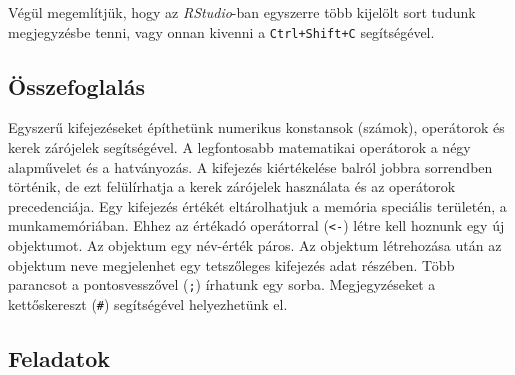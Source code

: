 \documentclass[
]{book}
\makeatletter
\newenvironment{kframe}{%
\medskip{}
\setlength{\fboxsep}{.8em}
 \def\at@end@of@kframe{}%
 \ifinner\ifhmode%
  \def\at@end@of@kframe{\end{minipage}}%
  \begin{minipage}{\columnwidth}%
 \fi\fi%
 \def\FrameCommand##1{\hskip\@totalleftmargin \hskip-\fboxsep
 \colorbox{shadecolor}{##1}\hskip-\fboxsep
     \hskip-\linewidth \hskip-\@totalleftmargin \hskip\columnwidth}%
 \MakeFramed {\advance\hsize-\width
   \@totalleftmargin\z@ \linewidth\hsize
   \@setminipage}}%
 {\par\unskip\endMakeFramed%
 \at@end@of@kframe}
\newenvironment{rmdblock}[1]
  {
  \begin{itemize}
  \renewcommand{\labelitemi}{
    \raisebox{-.7\height}[0pt][0pt]{
      {\setkeys{Gin}{width=3em,keepaspectratio}\texttt{[image: images/\#1]}}
    }
  }
  \setlength{\fboxsep}{1em}
  \begin{kframe}
  \item
  }
  {
  \end{kframe}
  \end{itemize}
  }
\newenvironment{rmdsummary}
  {\begin{rmdblock}{summary}}
  {\end{rmdblock}}
\makeatother
\begin{document}
Végül megemlítjük, hogy az \emph{RStudio}-ban egyszerre több kijelölt sort tudunk megjegyzésbe tenni, vagy onnan kivenni a \texttt{Ctrl+Shift+C} segítségével.

\hypertarget{az-r-nyelv-1-summary}{%
\subsection{Összefoglalás}\label{az-r-nyelv-1-summary}}

\begin{rmdsummary}
Egyszerű kifejezéseket építhetünk numerikus konstansok (számok),
operátorok és kerek zárójelek segítségével. A legfontosabb matematikai
operátorok a négy alapművelet és a hatványozás. A kifejezés kiértékelése
balról jobbra sorrendben történik, de ezt felülírhatja a kerek zárójelek
használata és az operátorok precedenciája. Egy kifejezés értékét
eltárolhatjuk a memória speciális területén, a munkamemóriában. Ehhez az
értékadó operátorral (\texttt{\textless{}-}) létre kell hoznunk egy új
objektumot. Az objektum egy név-érték páros. Az objektum létrehozása
után az objektum neve megjelenhet egy tetszőleges kifejezés adat
részében. Több parancsot a pontosvesszővel (\texttt{;}) írhatunk egy
sorba. Megjegyzéseket a kettőskereszt (\texttt{\#}) segítségével
helyezhetünk el.
\end{rmdsummary}

\hypertarget{az-r-nyelv-1-exercise}{%
\subsection{Feladatok}\label{az-r-nyelv-1-exercise}}
\end{document}

